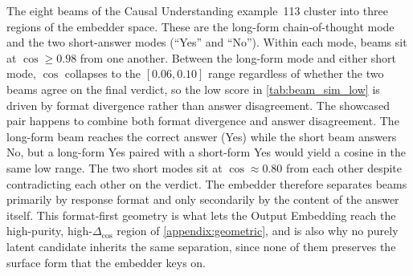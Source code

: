 The eight beams of the Causal Understanding example~113 cluster into three
regions of the embedder space. These are the long-form chain-of-thought mode and
the two short-answer modes (``Yes'' and ``No''). Within each mode,
beams sit at $\cos \ge 0.98$ from one another. Between the long-form
mode and either short mode, $\cos$ collapses to the $[0.06, 0.10]$
range regardless of whether the two beams agree on the final verdict,
so the low score in \cref{tab:beam_sim_low} is driven by format
divergence rather than answer disagreement. The showcased pair happens
to combine both format divergence and answer disagreement. The long-form beam reaches the correct answer (Yes)
while the short beam answers No, but a long-form Yes paired with a
short-form Yes would yield a cosine in the same low range. The two
short modes sit at $\cos \approx 0.80$ from each other despite
contradicting each other on the verdict. The embedder therefore
separates beams primarily by response format and only secondarily by
the content of the answer itself. This format-first geometry is what
lets the Output Embedding reach the high-purity, high-$\Delta_{\cos}$
region of \cref{appendix:geometric}, and is also why no purely latent
candidate inherits the same separation, since none of them preserves
the surface form that the embedder keys on.

